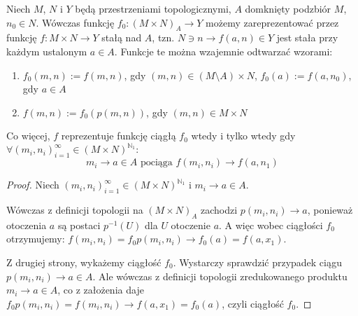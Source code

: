 \begin{prop}
  Niech $M$, $N$ i $Y$ będą przestrzeniami topologicznymi, $A$ domknięty podzbiór $M$, $n_0 \in N$. Wówczas funkcję $f_0: (M \times N)_A \rightarrow Y$ możemy zareprezentować przez funkcję $f: M \times N \rightarrow Y$ stałą nad $A$, tzn. $N \ni n \rightarrow f(a, n) \in Y$ jest stała przy każdym ustalonym $a \in A$. Funkcje te można wzajemnie odtwarzać wzorami:
  \begin{enumerate}
   \item $f_0(m,n) := f(m,n)$, gdy $(m,n) \in (M \setminus A) \times N$, $f_0(a) := f(a, n_0)$, gdy $a \in A$
   \item $f(m,n) := f_0(p(m,n))$, gdy $(m,n) \in M \times N$
  \end{enumerate}

  
  Co więcej, $f$ reprezentuje funkcję ciągłą $f_0$ wtedy i tylko wtedy gdy $\forall (m_i, n_i)_{i=1}^\infty \in (M \times N)^{\mathbb{N}_1}:$
  \[m_i \rightarrow a \in A \mbox{ pociąga } f(m_i, n_i) \rightarrow f(a, n_1)\]
  
  \begin{proof}
    Niech $(m_i, n_i)_{i=1}^\infty \in (M \times N)^{\mathbb{N}_1}$ i $m_i \rightarrow a \in A$.
    
    Wówczas z definicji topologii na $(M \times N)_A$ zachodzi $p(m_i, n_i) \rightarrow a$, ponieważ otoczenia $a$ są postaci $p^{-1}(U)$ dla $U$ otoczenie $a$. A więc wobec ciągłości $f_0$ otrzymujemy: $f(m_i, n_i) = f_0 p(m_i, n_i) \rightarrow f_0(a) = f(a, x_1)$.
    
    Z drugiej strony, wykażemy ciągłość $f_0$. Wystarczy sprawdzić przypadek ciągu $p(m_i, n_i) \rightarrow a \in A$. Ale wówczas z definicji topologii zredukowanego produktu $m_i \rightarrow a \in A$, co z założenia daje $f_0 p(m_i, n_i) = f(m_i, n_i) \rightarrow f(a, x_1) = f_0(a)$, czyli ciągłość $f_0$.
  \end{proof}
\end{prop}

